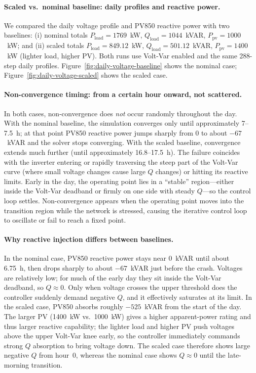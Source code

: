 \documentclass[11pt]{article}
\begin{document}
\paragraph{Scaled vs.\ nominal baseline: daily profiles and reactive power.}
We compared the daily voltage profile and PV850 reactive power with two baselines: (i) nominal totals $P_{\mathrm{load}}=1769$~kW, $Q_{\mathrm{load}}=1044$~kVAR, $P_{\mathrm{pv}}=1000$~kW; and (ii) scaled totals $P_{\mathrm{load}}=849.12$~kW, $Q_{\mathrm{load}}=501.12$~kVAR, $P_{\mathrm{pv}}=1400$~kW (lighter load, higher PV). Both runs use Volt-Var enabled and the same 288-step daily profiles. Figure~\ref{fig:daily-voltage-baseline} shows the nominal case; Figure~\ref{fig:daily-voltage-scaled} shows the scaled case.

\paragraph{Non-convergence timing: from a certain hour onward, not scattered.}
In both cases, non-convergence does \emph{not} occur randomly throughout the day. With the nominal baseline, the simulation converges only until approximately 7--7.5~h; at that point PV850 reactive power jumps sharply from 0 to about $-67$~kVAR and the solver stops converging. With the scaled baseline, convergence extends much further (until approximately 16.8--17.5~h). The failure coincides with the inverter entering or rapidly traversing the steep part of the Volt-Var curve (where small voltage changes cause large $Q$ changes) or hitting its reactive limits. Early in the day, the operating point lies in a ``stable'' region---either inside the Volt-Var deadband or firmly on one side with steady $Q$---so the control loop settles. Non-convergence appears when the operating point moves into the transition region while the network is stressed, causing the iterative control loop to oscillate or fail to reach a fixed point.

\paragraph{Why reactive injection differs between baselines.}
In the nominal case, PV850 reactive power stays near 0~kVAR until about 6.75~h, then drops sharply to about $-67$~kVAR just before the crash. Voltages are relatively low; for much of the early day they sit inside the Volt-Var deadband, so $Q \approx 0$. Only when voltage crosses the upper threshold does the controller suddenly demand negative $Q$, and it effectively saturates at its limit. In the scaled case, PV850 absorbs roughly $-525$~kVAR from the start of the day. The larger PV (1400~kW vs.\ 1000~kW) gives a higher apparent-power rating and thus larger reactive capability; the lighter load and higher PV push voltages above the upper Volt-Var knee early, so the controller immediately commands strong $Q$ absorption to bring voltage down. The scaled case therefore shows large negative $Q$ from hour~0, whereas the nominal case shows $Q \approx 0$ until the late-morning transition.
\end{document}
